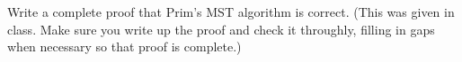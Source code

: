 Write a complete proof that Prim's MST algorithm is correct.
(This was given in class.
Make sure you write up the proof and check it throughly, filling in
gaps when necessary so that proof is complete.)
